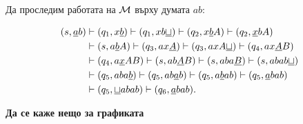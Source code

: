 \begin{example}
Да проследим работата на $\mathcal{M}$ върху думата $ab$:

\begin{align*}
  (s, \underline{a}b) & \vdash (q_1, x\underline{b}) \vdash (q_1,xb\underline{\sqcup}) \vdash (q_2, x\underline{b}A) \vdash (q_2, \underline{x}bA)\\
                      & \vdash (s, a\underline{b}A) \vdash (q_3, ax\underline{A}) \vdash (q_3, axA\underline{\sqcup}) \vdash (q_4, ax\underline{A}B)\\
                      & \vdash (q_4, a\underline{x}AB) \vdash (s, ab\underline{A}B) \vdash (s,aba\underline{B}) \vdash (s, abab\underline{\sqcup})\\
                      & \vdash (q_5, aba\underline{b}) \vdash (q_5, ab\underline{a}b) \vdash (q_5, a\underline{b}ab) \vdash (q_5, \underline{a}bab)\\
                      & \vdash (q_5, \underline{\sqcup}abab) \vdash (q_6, \underline{a}bab).
\end{align*}

  
\end{example}


{\bf Да се каже нещо за графиката}

